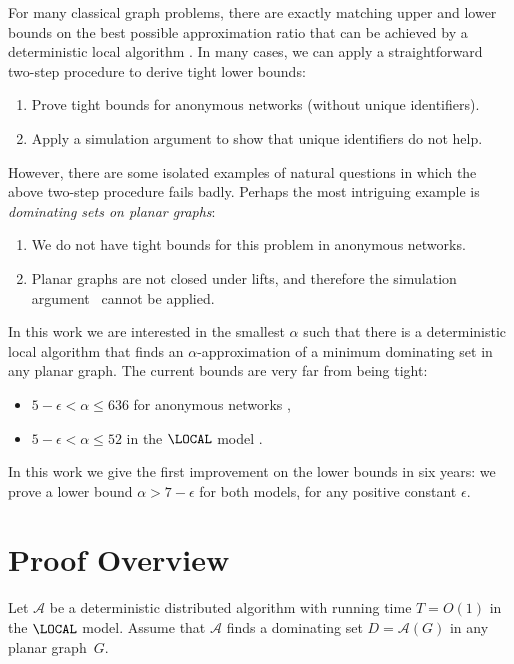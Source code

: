 \documentclass[11pt,a4paper]{article}
\theoremstyle{definition}
\newcommand{\A}{\mathcal{A}}
\begin{document}
For many classical graph problems, there are exactly matching upper and lower bounds on the best possible approximation ratio that can be achieved by a deterministic local algorithm \cite{suomela13survey}. In many cases, we can apply a straightforward two-step procedure to derive tight lower bounds:
\begin{enumerate}[noitemsep]
    \item Prove tight bounds for anonymous networks (without unique identifiers).
    \item Apply a simulation argument \cite{goos13local-approximation} to show that unique identifiers do not help.
\end{enumerate}
However, there are some isolated examples of natural questions in which the above two-step procedure fails badly. Perhaps the most intriguing example is \emph{dominating sets on planar graphs}:
\begin{enumerate}[noitemsep]
    \item We do not have tight bounds for this problem in anonymous networks.
    \item Planar graphs are not closed under lifts, and therefore the simulation argument~\cite{goos13local-approximation} cannot be applied.
\end{enumerate}
In this work we are interested in the smallest $\alpha$ such that there is a deterministic local algorithm that finds an $\alpha$-approximation of a minimum dominating set in any planar graph. The current bounds are very far from being tight:
\begin{itemize}[noitemsep]
    \item $5-\epsilon < \alpha \le 636$ for anonymous networks \cite{czygrinow08fast,wawrzyniak13mds-brief},
    \item $5-\epsilon < \alpha \le 52$ in the $\LOCAL$ model \cite{czygrinow08fast,lenzen11phd,lenzen13mds,wawrzyniak14mds-analysis}.
\end{itemize}
In this work we give the first improvement on the lower bounds in six years: we prove a lower bound $\alpha > 7-\epsilon$ for both models, for any positive constant $\epsilon$.


\section{Proof Overview}

Let $\A$ be a deterministic distributed algorithm with running time $T = O(1)$ in the $\LOCAL$ model. Assume that $\A$ finds a dominating set $D = \A(G)$ in any planar graph~$G$.
\end{document}
